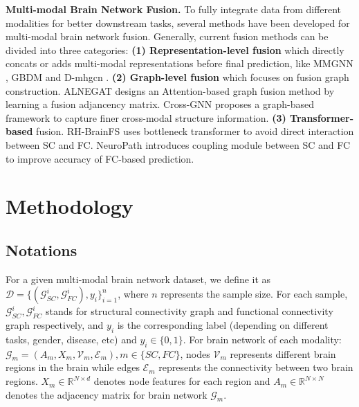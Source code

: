 \documentclass[10pt,twocolumn,letterpaper]{article}
\begin{document}


\vspace{0.35em}
\noindent\textbf{Multi-modal Brain Network Fusion.} To fully integrate data from different modalities for better downstream tasks, several methods have been developed for multi-modal brain network fusion. Generally, current fusion methods can be divided into three categories: \textbf{(1) Representation-level fusion} which directly concats or adds multi-modal representations before final prediction, like MMGNN \cite{sebenius2021multimodal}, GBDM \cite{zhang2021deep} and D-mhgcn \cite{wen2024d}. \textbf{(2) Graph-level fusion} which focuses on fusion graph construction. ALNEGAT \cite{chen2022adversarial} designs an Attention-based graph fusion method by learning a fusion adjancency matrix. Cross-GNN \cite{yang2023mapping} proposes a graph-based framework to capture finer cross-modal structure information. \textbf{(3) Transformer-based} fusion. RH-BrainFS  \cite{ye2024rh} uses bottleneck transformer to avoid direct interaction between SC and FC. NeuroPath \cite{wei2024neuropath} introduces coupling module between SC and FC to improve accuracy of FC-based prediction.

\section{Methodology}
\subsection{Notations}
For a given multi-modal brain network dataset, we define it as $\mathcal{D} = \{(\mathcal{G}_{SC}^i, \mathcal{G}_{FC}^i), y_i\}_{i=1}^{n}$, where $n$ represents the sample size. For each sample, $\mathcal{G}_{SC}^i, \mathcal{G}_{FC}^i$ stands for structural connectivity graph and functional connectivity graph respectively, and $y_i$ is the corresponding label (depending on different tasks, gender, disease, etc) and $y_i \in \{0,1\}$. For brain network of each modality: $\mathcal{G}_{m} = (A_m, X_m, \mathcal{V}_{m}, \mathcal{E}_{m}), m \in \{SC, FC\}$, nodes $\mathcal{V}_m$ represents different brain regions in the brain while edges $\mathcal{E}_m$ represents the connectivity between two brain regions. $X_m\in\mathbb{R}^{N\times d}$ denotes node features for each region and $A_m \in \mathbb{R}^{N \times N}$ denotes the adjacency matrix for brain network $\mathcal{G}_m$.
\end{document}
